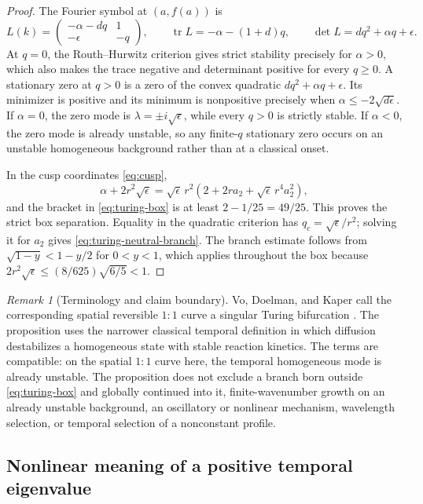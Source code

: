 \documentclass[11pt,reqno]{amsart}
\numberwithin{equation}{section}
\theoremstyle{definition}
\theoremstyle{remark}
\newtheorem{remark}[theorem]{Remark}
\begin{document}
\begin{proof}
The Fourier symbol at $(a,f(a))$ is
\[
 L(k)=\begin{pmatrix}-\alpha-dq&1\\-\epsilon&-q\end{pmatrix},
 \qquad
 \operatorname{tr}L=-\alpha-(1+d)q,
 \qquad
 \det L=dq^2+\alpha q+\epsilon.
\]
At $q=0$, the Routh--Hurwitz criterion gives strict stability precisely for
$\alpha>0$, which also makes the trace negative and determinant positive for
every $q\ge0$.  A stationary zero at $q>0$ is a zero of the convex quadratic
$dq^2+\alpha q+\epsilon$.  Its minimizer is positive and its minimum is
nonpositive precisely when
$\alpha\le-2\sqrt{d\epsilon}$.
If $\alpha=0$, the zero mode is $\lambda=\pm i\sqrt\epsilon$, while every
$q>0$ is strictly stable.  If $\alpha<0$, the zero mode is already unstable,
so any finite-$q$ stationary zero occurs on an unstable homogeneous
background rather than at a classical onset.

In the cusp coordinates \eqref{eq:cusp},
\[
 \alpha+2r^2\sqrt\epsilon
 =\sqrt\epsilon\,r^2
  \left(2+2ra_2+\sqrt\epsilon\,r^4a_2^2\right),
\]
and the bracket in \eqref{eq:turing-box} is at least
$2-1/25=49/25$.  This proves the strict box separation.  Equality in the
quadratic criterion has $q_c=\sqrt\epsilon/r^2$; solving it for $a_2$ gives
\eqref{eq:turing-neutral-branch}.  The branch estimate follows from
$\sqrt{1-y}<1-y/2$ for $0<y<1$, which applies throughout the box because
$2r^2\sqrt\epsilon\le(8/625)\sqrt{6/5}<1$.
\end{proof}

\begin{remark}[Terminology and claim boundary]
Vo, Doelman, and Kaper call the corresponding spatial reversible $1{:}1$
curve a singular Turing bifurcation \cite{VoDoelmanKaper2025}.  The
proposition uses the narrower classical temporal definition in which
diffusion destabilizes a homogeneous state with stable reaction kinetics.
The terms are compatible: on the spatial $1{:}1$ curve here, the temporal
homogeneous mode is already unstable.  The proposition does not exclude a
branch born outside \eqref{eq:turing-box} and globally continued into it,
finite-wavenumber growth on an already unstable background, an oscillatory
or nonlinear mechanism, wavelength selection, or temporal selection of a
nonconstant profile.
\end{remark}

\subsection{Nonlinear meaning of a positive temporal eigenvalue}
\end{document}
